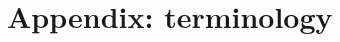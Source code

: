 \documentclass[letter,12pt]{article}
\begin{document}




\singlespacing

\section{Appendix: terminology}

\end{document}

